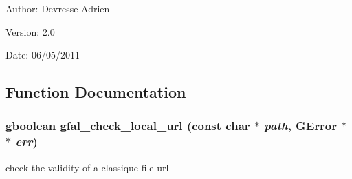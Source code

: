 \begin{Desc}
\item[Author:]Devresse Adrien \end{Desc}
\begin{Desc}
\item[Version:]2.0 \end{Desc}
\begin{Desc}
\item[Date:]06/05/2011 \end{Desc}


\subsection{Function Documentation}
\subsubsection{\setlength{\rightskip}{0pt plus 5cm}gboolean gfal\_\-check\_\-local\_\-url (const char $\ast$ {\em path}, GError $\ast$$\ast$ {\em err})}\label{gfal__posix__local__file_8c_02987ce8beeb908c36ee3d4ef3bc5618}


check the validity of a classique file url 